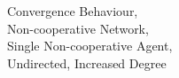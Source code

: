 \documentclass[a4paper, 12pt]{report}
\begin{document}
\begin{figure}[!htbp]
\begin{minipage}{.45\linewidth}
    \end{minipage}\par\medskip
    \centering
    
    \caption{Convergence Behaviour, \\ Non-cooperative Network, \\ Single Non-cooperative Agent, \\ Undirected, Increased Degree}
\end{figure}

\newpage
\end{document}
